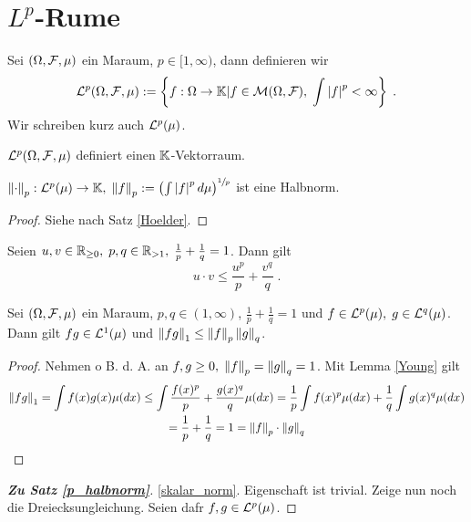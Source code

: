 \section{$L^p$-R\as ume}

\begin{definition}
	Sei \((\Omega, \mathcal{F}, \mu)\) ein Ma\s raum, \(p\in [1,\infty)\), dann definieren wir
	\[\mathcal{L}^p(\Omega, \mathcal{F}, \mu) := \left\{f:\Omega \to \mathbb{K} \vert f\in \mathcal{M}(\Omega, \mathcal{F}), \; \int \left\lvert f \right\rvert^p < \infty\right\}\;.\]
	Wir schreiben kurz auch \(\mathcal{L}^p(\mu)\).
\end{definition}
\begin{rem}
	\(\mathcal{L}^p(\Omega, \mathcal{F}, \mu)\) definiert einen $\mathbb{K}$-Vektorraum.
\end{rem}

\begin{theorem}
	\(\left\lVert\cdot\right\rVert_p: \mathcal{L}^p(\mu) \to \mathbb{K}, \; \left\lVert f\right\rVert_p := \left(\int \left\lvert f \right\rvert^p d \mu\right)^{\sfrac{1}{p}}\) ist eine Halbnorm. \label{p_halbnorm}
\end{theorem}
\begin{proof}
	Siehe nach Satz \ref{Hoelder}.
\end{proof}
\begin{lemma}
	Seien \(u,v \in \mathbb{R}_{\geq 0}, \; p, q \in \mathbb{R}_{>1}, \; \frac{1}{p} + \frac{1}{q} = 1\). Dann gilt
	\[u\cdot v \leq \frac{u^p}{p} + \frac{v^q}{q}\;.\]\label{Young}
\end{lemma}

\begin{theorem}
	Sei \((\Omega, \mathcal{F}, \mu)\) ein Ma\s raum, \(p, q \in (1,\infty)\), \(\frac{1}{p} + \frac{1}{q} = 1\) und \(f\in \mathcal{L}^p(\mu), \;g\in \mathcal{L}^q(\mu)\). Dann gilt \(fg \in \mathcal{L}^1(\mu)\) und \(\left\lVert fg\right\rVert_1 \leq \left\lVert f\right\rVert_p \left\lVert g\right\rVert_q\).
	\label{Hoelder}
\end{theorem}
\begin{proof}
	Nehmen o B. d. A. an \(f,g \geq 0, \; \left\lVert f\right\rVert_p = \left\lVert g\right\rVert_q = 1\). Mit Lemma \ref{Young} gilt
	\begin{multline*}\left\lVert fg\right\rVert_1 = \int f(x) g(x) \mu(dx) \leq \int \frac{f(x)^p}{p} + \frac{g(x)^q}{q}\mu(dx) = \frac{1}{p} \int f(x)^p \mu(dx) + \frac{1}{q} \int g(x)^q \mu(dx) \\= \frac{1}{p} + \frac{1}{q} = 1 = \left\lVert f\right\rVert_p \cdot \left\lVert g\right\rVert_q
	\end{multline*}
\end{proof}

\begin{proof}[\textbf{Zu Satz \ref{p_halbnorm}}]
	\ref{skalar_norm}. Eigenschaft ist trivial.
	Zeige nun noch die Dreiecksungleichung. Seien daf\us r \(f,g \in \mathcal{L}^p(\mu)\).
\end{proof}
